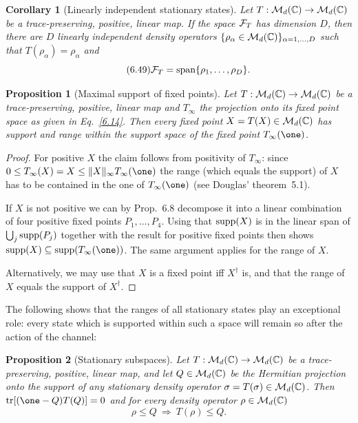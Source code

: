 \documentclass[11pt,a4paper]{article}
\theoremstyle{plain}
\newtheorem{proposition}{Proposition}[section]
\newtheorem{corollary}{Corollary}[section]
\theoremstyle{definition}
\theoremstyle{remark}
\begin{document}
\begin{corollary}[Linearly independent stationary states]
    Let $T:\mathcal{M}_d(\mathbb{C})\to\mathcal{M}_d(\mathbb{C})$ be a trace-preserving, positive, linear map. If
    the space $\mathcal{F}_T$ has dimension $D$, then there are $D$ linearly independent
    density operators $\{\rho_\alpha\in\mathcal{M}_d(\mathbb{C})\}_{\alpha=1,\dots,D}$ such that
    $T(\rho_\alpha)=\rho_\alpha$ and
    \begin{equation}\tag{6.49}
        \mathcal{F}_T = \operatorname{span}\{\rho_1,\dots,\rho_D\}.
    \end{equation}
\end{corollary}

\begin{proposition}[Maximal support of fixed points]
    Let $T:\mathcal{M}_d(\mathbb{C})\to\mathcal{M}_d(\mathbb{C})$ be a trace-preserving, positive, linear map and
    $T_\infty$ the projection onto its fixed point space as given in Eq.~\eqref{6.14}.
    Then every fixed point $X=T(X)\in\mathcal{M}_d(\mathbb{C})$ has support and range within the
    support space of the fixed point $T_\infty(\one)$.
\end{proposition}

\begin{proof}
    For positive $X$ the claim follows from positivity of $T_\infty$: since
    $0\le T_\infty(X)=X\le \lVert X\rVert_\infty T_\infty(\one)$ the range (which
    equals the support) of $X$ has to be contained in the one of $T_\infty(\one)$
    (see Douglas' theorem~5.1).

    If $X$ is not positive we can by Prop.~6.8 decompose it into a linear combination
    of four positive fixed points $P_1,\dots,P_4$. Using that $\operatorname{supp}(X)$ is in the
    linear span of $\bigcup_j \operatorname{supp}(P_j)$ together with the result for positive fixed
    points then shows $\supp(X)\subseteq \supp(T_\infty(\one))$. The same argument
    applies for the range of $X$.

    Alternatively, we may use that $X$ is a fixed point iff $X^\dagger$ is, and that
    the range of $X$ equals the support of $X^\dagger$.
\end{proof}

The following shows that the ranges of all stationary states play an exceptional
role: every state which is supported within such a space will remain so after
the action of the channel:

\begin{proposition}[Stationary subspaces]
    Let $T:\mathcal{M}_d(\mathbb{C})\to\mathcal{M}_d(\mathbb{C})$ be a trace-preserving, positive, linear map, and
    let $Q\in\mathcal{M}_d(\mathbb{C})$ be the Hermitian projection onto the support of any
    stationary density operator $\sigma=T(\sigma)\in\mathcal{M}_d(\mathbb{C})$. Then
    $\tr[(\one-Q)T(Q)]=0$ and for every density operator $\rho\in\mathcal{M}_d(\mathbb{C})$
    \begin{equation}\tag{6.50}
        \rho\le Q \ \Rightarrow\ T(\rho)\le Q.
    \end{equation}
\end{proposition}
\end{document}
